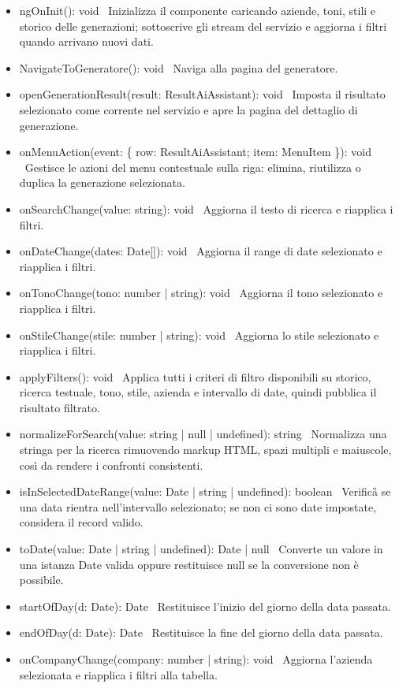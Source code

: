 \documentclass[a4paper,11pt]{article}
\begin{document}
\begin{itemize}[noitemsep, topsep=0pt]
\item ngOnInit(): void \
Inizializza il componente caricando aziende, toni, stili e storico delle generazioni; sottoscrive gli stream del servizio e aggiorna i filtri quando arrivano nuovi dati.

\item NavigateToGeneratore(): void \
Naviga alla pagina del generatore.

\item openGenerationResult(result: ResultAiAssistant): void \
Imposta il risultato selezionato come corrente nel servizio e apre la pagina del dettaglio di generazione.

\item onMenuAction(event: \{ row: ResultAiAssistant; item: MenuItem \}): void \
Gestisce le azioni del menu contestuale sulla riga: elimina, riutilizza o duplica la generazione selezionata.

\item onSearchChange(value: string): void \
Aggiorna il testo di ricerca e riapplica i filtri.

\item onDateChange(dates: Date[]): void \
Aggiorna il range di date selezionato e riapplica i filtri.

\item onTonoChange(tono: number | string): void \
Aggiorna il tono selezionato e riapplica i filtri.

\item onStileChange(stile: number | string): void \
Aggiorna lo stile selezionato e riapplica i filtri.

\item applyFilters(): void \
Applica tutti i criteri di filtro disponibili su storico, ricerca testuale, tono, stile, azienda e intervallo di date, quindi pubblica il risultato filtrato.

\item normalizeForSearch(value: string | null | undefined): string \
Normalizza una stringa per la ricerca rimuovendo markup HTML, spazi multipli e maiuscole, così da rendere i confronti consistenti.

\item isInSelectedDateRange(value: Date | string | undefined): boolean \
Verifica\G{} se una data rientra nell'intervallo selezionato; se non ci sono date impostate, considera il record valido.

\item toDate(value: Date | string | undefined): Date | null \
Converte un valore in una istanza Date valida oppure restituisce null se la conversione non è possibile.

\item startOfDay(d: Date): Date \
Restituisce l'inizio del giorno della data passata.

\item endOfDay(d: Date): Date \
Restituisce la fine del giorno della data passata.

\item onCompanyChange(company: number | string): void \
Aggiorna l'azienda selezionata e riapplica i filtri alla tabella.
\end{itemize}
\end{document}
